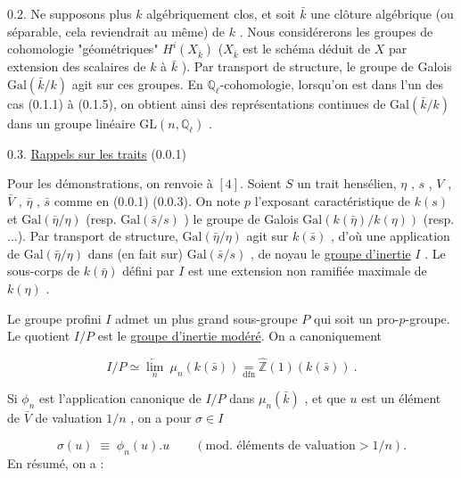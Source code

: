 0.2. Ne supposons plus  $k$  algébriquement clos, et soit  $\bar{k}$  une clôture algébrique (ou séparable, cela reviendrait au même) de  $k$ . Nous considérerons les groupes de cohomologie "géométriques"  $H^i(X_{\bar{k}})$  ($X_{\bar{k}}$  est le schéma déduit de  $X$  par extension des scalaires de  $k$  à  $\bar{k}$ ). Par transport de structure, le groupe de Galois  $\mathrm{Gal}(\bar{k}/k)$  agit sur ces groupes. En  $\mathbb{Q}_\ell$-cohomologie, lorsqu'on est dans l'un des cas (0.1.1) à (0.1.5), on obtient ainsi des représentations continues de  $\mathrm{Gal}(\bar{k}/k)$  dans un groupe linéaire  $\mathrm{GL}(n,\mathbb{Q}_\ell)$ .


0.3. \underline{Rappels sur les traits} (0.0.1)

Pour les démonstrations, on renvoie à $[4]$. Soient  $S$  un trait hensélien, $\eta$ , $s$ , $V$ , $\bar{V}$ , $\bar{\eta}$ , $\bar{s}$  comme en (0.0.1) (0.0.3). On note  $p$  l'exposant caractéristique de  $k(s)$  et  $\mathrm{Gal}(\bar{\eta}/\eta)$  (resp.  $\mathrm{Gal}(\bar{s}/s)$ ) le groupe de Galois  $\mathrm{Gal}(k(\bar{\eta})/k(\eta))$  (resp. ...). Par transport de structure,  $\mathrm{Gal}(\bar{\eta}/\eta)$  agit sur  $k(\bar{s})$ , d'où une application de $\mathrm{Gal}(\bar{\eta}/\eta)$  dans (en fait sur)  $\mathrm{Gal}(\bar{s}/s)$ , de noyau le \underline{groupe d'inertie}  $I$ . Le sous-corps de  $k(\bar{\eta})$  défini par  $I$  est une extension non ramifiée maximale de  $k(\eta)$ .

Le groupe profini  $I$  admet un plus grand sous-groupe  $P$  qui soit un pro-$p$-groupe. Le quotient  $I/P$  est le \underline{groupe d'inertie modéré}. On a canoniquement

\begin{equation*}
I/P \simeq \underset{n}{\underleftarrow{\lim}}\ \mu_n(k(\bar{s})) \underset{\mathrm{dfn}}{=} \widehat{\mathbb{Z}}(1)(k(\bar{s})) \ .
\end{equation*}


Si  $\phi_n$  est l'application canonique de  $I/P$  dans  $\mu_n(\bar{k})$ , et que  $u$  est un élément de  $\bar{V}$  de valuation  $1/n$ , on a pour  $\sigma \in I$

\begin{equation*}
\sigma(u) \;\equiv\; \phi_n(u).u \qquad (\text{mod. éléments de valuation} > 1/n).
\end{equation*}
En résumé, on a :

